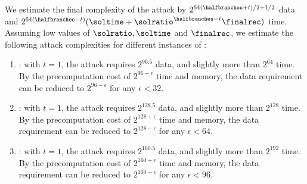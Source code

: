 We estimate the final complexity of the attack by $2^{64(\halfbranches+t)/2+1/2}$ data and $2^{64(\halfbranches-t)}(\soltime + \solratio^{\halfbranches-t} \finalrec)$ time.
Assuming low values of $\solratio,\soltime$ and $\finalrec$, we estimate the following attack complexities for different instances of \aead{}:
\begin{enumerate}
    \item {}: with $t=1$, the attack requires $2^{96.5}$ data, and slightly more than $2^{64}$ time.
    By the precomputation cost of $2^{96+\epsilon}$ time and memory, the data requirement can be reduced to $2^{96-\epsilon}$ for any $\epsilon < 32$.

    \item {}: with $t=1$, the attack requires $2^{128.5}$ data, and slightly more than $2^{128}$ time.
    By the precomputation cost of $2^{128+\epsilon}$ time and memory, the data requirement can be reduced to $2^{128-\epsilon}$ for any $\epsilon < 64$.
    
    \item {}: with $t=1$, the attack requires $2^{160.5}$ data, and slightly more than $2^{192}$ time.
    By the precomputation cost of $2^{160+\epsilon}$ time and memory, the data requirement can be reduced to $2^{160-\epsilon}$ for any $\epsilon < 96$.
\end{enumerate}
